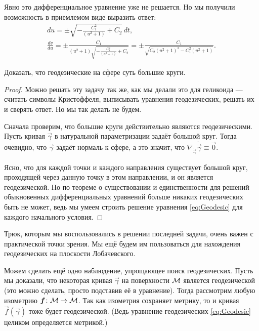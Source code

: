 \begin{solution}
	Явно это дифференциальное уравнение уже не решается. Но мы получили возможность в приемлемом виде выразить ответ:
	\begin{gather*}
		du = \pm\sqrt{-\frac{C_1^2}{(u^2 + 1)} + C_2}\,dt,\\
		\frac{dv}{du} = \pm\frac{C_1}{(u^2 + 1)\sqrt{-\frac{C_1^2}{(u^2 + 1)} + C_2}} = \pm\frac{C_1}{\sqrt{C_2(u^2 + 1)^2 - C_1^2(u^2 + 1)}}.
	\end{gather*}
\end{solution}

\begin{problem} \label{eq:GeodesicSphere}
	Доказать, что геодезические на сфере суть большие круги.
\end{problem}

\begin{proof}
	Можно решать эту задачу так же, как мы делали это для геликоида --- считать символы Кристоффеля, выписывать уравнения геодезических, решать их и сверять ответ. Но мы так делать не будем\footnotemark.


	Сначала проверим, что большие круги действительно являются геодезическими. Пусть кривая $\vec{\gamma}$ в натуральной параметризации задаёт большой круг. Тогда очевидно, что $\ddot{\vec{\gamma}}$ задаёт нормаль к сфере, а это значит, что $\nabla_{\dot{\vec{\gamma}}}\dot{\vec{\gamma}} \equiv \vec{0}$.

	Ясно, что для каждой точки и каждого направления существует большой круг, проходящей через данную точку в этом направлении, и он является геодезической. Но по теореме о существовании и единственности для решений обыкновенных дифференциальных уравнений больше никаких геодезических быть не может, ведь мы умеем строить решение уравнения \eqref{eq:Geodesic} для каждого начального условия.
\end{proof}

Трюк, которым мы воспользовались в решении последней задачи, очень важен с практической точки зрения. Мы ещё будем им пользоваться для нахождения геодезических на плоскости Лобачевского.

Можем сделать ещё одно наблюдение, упрощающее поиск геодезических. Пусть мы доказали, что некоторая кривая $\vec{\gamma}$ на поверхности $\mathcal{M}$ является геодезической (это можно сделать, просто подставив её в уравнение). Тогда рассмотрим любую изометрию $\boldsymbol{f}\colon \mathcal{M} \to \mathcal{M}$. Так как изометрия сохраняет метрику, то и кривая $\vec{f}(\vec{\gamma})$ тоже будет геодезической. (Ведь уравнение геодезических \eqref{eq:Geodesic} целиком определяется метрикой.)

